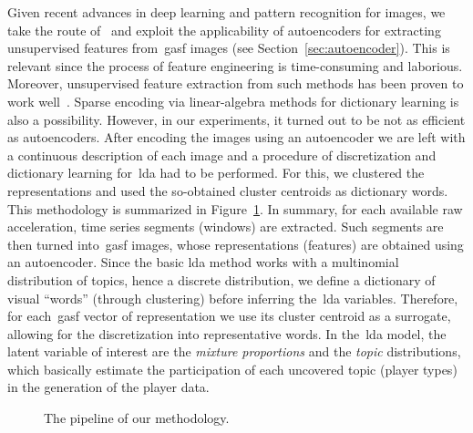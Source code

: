 Given recent advances in deep learning and pattern recognition for images, we take the route of~\citep{wang_encoding_2015} and exploit the applicability of autoencoders for extracting unsupervised features from~\gls{gasf} images (see Section~\ref{sec:autoencoder}). This is relevant since the process of feature engineering is time-consuming and laborious. Moreover, unsupervised feature extraction from such methods has been proven to work well~\citep{wang_imaging_2015, wang_time_2016}.
Sparse encoding via linear-algebra methods for dictionary learning is also a possibility. However, in our experiments, it turned out to be not as efficient as autoencoders. After encoding the images using an autoencoder we are left with a continuous description of each image and a procedure of discretization and dictionary learning for~\gls{lda} had to be performed. For this, we clustered the representations and used the so-obtained cluster centroids as dictionary words. This methodology is summarized in Figure~\ref{diagram:methodology}. In summary, 
for each available raw acceleration, time series segments (windows) are extracted. Such segments are then turned into~\gls{gasf} images, whose representations (features) are obtained using an autoencoder. Since the basic \gls{lda} method works with a multinomial distribution of topics, hence a discrete distribution, we define a dictionary of visual ``words'' (through clustering) before inferring the~\gls{lda} variables. Therefore, for each~\gls{gasf} vector of representation we use its cluster centroid as a surrogate, allowing for the discretization into representative words. In the~\gls{lda} model, the latent variable of interest are the \textit{mixture proportions} and the \textit{topic} distributions, which basically estimate the participation of each uncovered topic (player types) in the generation of the player data.

\begin{figure}[h]
	\centering
    \caption{The pipeline of our methodology.}
    \label{diagram:methodology}
\end{figure}

